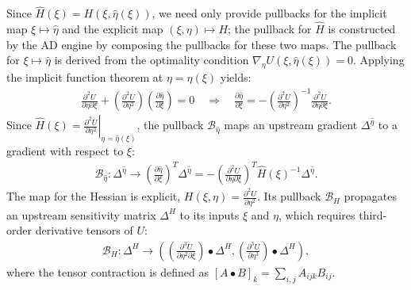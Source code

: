 \documentclass{article}
\begin{document}
Since $\hat{H}(\xi) = H(\xi, \hat{\eta}(\xi))$, we need only provide pullbacks for the implicit map $\xi \mapsto \hat{\eta}$ and the explicit map $(\xi, \eta) \mapsto H$; the pullback for $\hat{H}$ is constructed by the AD engine by composing the pullbacks for these two maps.
The pullback for $\xi \mapsto \hat{\eta}$ is derived from the optimality condition $\nabla_\eta U(\xi, \hat{\eta}(\xi)) = 0$.
Applying the implicit function theorem at $\eta = \hat{\eta}(\xi)$ yields:
%
\begin{align}
  \frac{\partial^2 U}{\partial \eta \partial \xi} + \left(\frac{\partial^2 U}{\partial \eta^2}\right) \left(\frac{\partial \hat{\eta}}{\partial \xi}\right) = 0
  \quad \Rightarrow \quad
  \frac{\partial \hat{\eta}}{\partial \xi} = -\left(\frac{\partial^2 U}{\partial \eta^2}\right)^{-1} \frac{\partial^2 U}{\partial \eta \partial \xi}.
\end{align}
%
Since $\hat{H}(\xi) = \left. \frac{\partial^2 U}{\partial \eta^2} \right|_{\eta=\hat{\eta}(\xi)}$, the pullback $\mathcal{B}_{\hat{\eta}}$ maps an upstream gradient $\Delta^{\hat{\eta}}$ to a gradient with respect to $\xi$:
%
\begin{align}\label{eq:pullback-eta-hat}
  \mathcal{B}_{\hat{\eta}} : \Delta^{\hat{\eta}} \to \left(\frac{\partial \hat{\eta}}{\partial \xi}\right)^{T} \Delta^{\hat{\eta}}
  = -\left(\frac{\partial^2 U}{\partial \eta \partial \xi}\right)^{T} \hat{H}(\xi)^{-1} \Delta^{\hat{\eta}}.
\end{align}
%
The map for the Hessian is explicit, $H(\xi, \eta) = \frac{\partial^2 U}{\partial \eta^2}$.
Its pullback $\mathcal{B}_H$ propagates an upstream sensitivity matrix $\Delta^H$ to its inputs $\xi$ and $\eta$, which requires third-order derivative tensors of $U$:
%
\begin{align}\label{eq:pullback-H}
  \mathcal{B}_H : \Delta^H \to \left( \left(\frac{\partial^3 U}{\partial \eta^2 \partial \xi}\right) \bullet \Delta^H, \left(\frac{\partial^3 U}{\partial \eta^3}\right) \bullet \Delta^H \right),
\end{align}
%
where the tensor contraction is defined as $[A \bullet B]_k = \sum_{i,j} A_{ij k} B_{ij}$.
\end{document}
